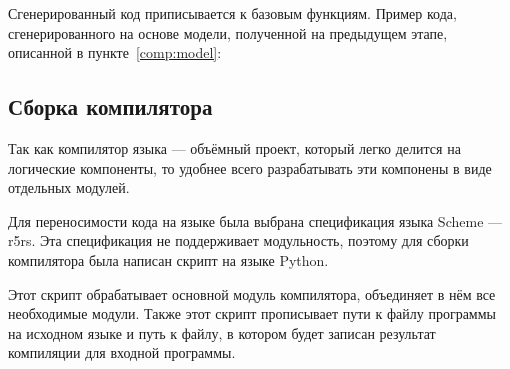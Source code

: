     Сгенерированный код приписывается к базовым функциям.
    \clearpage
    Пример кода, сгенерированного на основе модели, полученной на предыдущем этапе, описанной в пункте~\ref{comp:model}:

    

    \subsection{Сборка компилятора}
    Так как компилятор языка --- объёмный проект, который легко делится на логические компоненты, то удобнее всего разрабатывать эти компонены в виде отдельных модулей.

    Для переносимости кода на языке была выбрана спецификация языка Scheme --- r5rs.
    Эта спецификация не поддерживает модульность, поэтому для сборки компилятора была написан скрипт на языке Python.

    Этот скрипт обрабатывает основной модуль компилятора, объединяет в нём все необходимые модули.
    Также этот скрипт прописывает пути к файлу программы на исходном языке и путь к файлу, в котором будет записан результат компиляции для входной программы.

